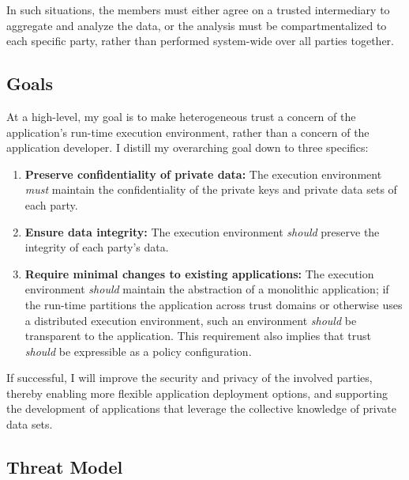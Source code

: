 In such situations, the members must either agree on a trusted intermediary to
aggregate and analyze the data, or the analysis must be compartmentalized to
each specific party, rather than performed system-wide  over all parties
together.


%


\subsection{Goals}
At a high-level, my goal is to make heterogeneous trust a concern
of the application's run-time execution environment, rather than a concern of
the application developer.
%
I distill my overarching goal down to three specifics:

\begin{enumerate}
\item \textbf{Preserve confidentiality of private data:}
    The execution environment \emph{must} maintain the confidentiality of the
    private keys and private data sets of each party.

\item \textbf{Ensure data integrity:} 
    The execution environment \emph{should} preserve the integrity of each
    party's data.

\item \textbf{Require minimal changes to existing applications:}
    The execution environment \emph{should} maintain the abstraction of a
    monolithic application; if the run-time partitions the application
    across trust domains or otherwise uses a distributed execution
    environment, such an environment \emph{should} be transparent to the
    application.  
    This requirement also implies that trust \emph{should} be
    expressible as a policy configuration.
\end{enumerate}

If successful, I will improve the security and privacy of the involved parties,
thereby enabling more flexible application deployment options, and supporting
the development of applications that leverage the collective knowledge of
private data sets.


\subsection{Threat Model}

